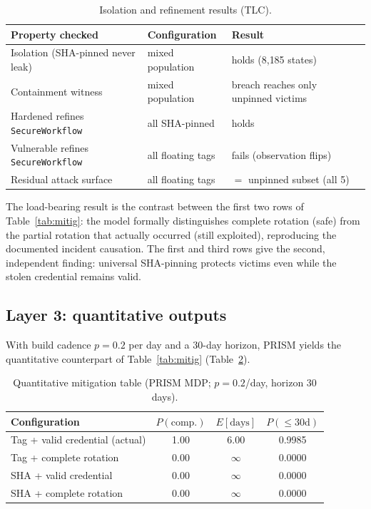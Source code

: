 \documentclass[letterpaper,twocolumn,10pt]{article}
\newcommand{\code}[1]{\texttt{\small #1}}
\begin{document}
\begin{table}[t]\centering
\caption{Isolation and refinement results (TLC).}\label{tab:iso}
\begin{tabular}{@{}lll@{}}
\toprule
Property checked & Configuration & Result\\
\midrule
Isolation (SHA-pinned never leak) & mixed population & holds (8{,}185 states)\\
Containment witness & mixed population & breach reaches only unpinned victims\\
Hardened refines \code{SecureWorkflow} & all SHA-pinned & holds\\
Vulnerable refines \code{SecureWorkflow} & all floating tags & fails (observation flips)\\
Residual attack surface & all floating tags & $=$ unpinned subset (all 5)\\
\bottomrule
\end{tabular}
\end{table}

The load-bearing result is the contrast between the first two rows of Table~\ref{tab:mitig}: the model formally distinguishes complete rotation (safe) from the partial rotation that actually occurred (still exploited), reproducing the documented incident causation. The first and third rows give the second, independent finding: universal SHA-pinning protects victims even while the stolen credential remains valid.

\subsection{Layer 3: quantitative outputs}
With build cadence $p = 0.2$ per day and a 30-day horizon, PRISM yields the quantitative counterpart of Table~\ref{tab:mitig} (Table~\ref{tab:quant}).

\begin{table}[t]\centering
\caption{Quantitative mitigation table (PRISM MDP; $p=0.2$/day, horizon 30 days).}\label{tab:quant}
\small
\begin{tabular}{@{}lccc@{}}
\toprule
Configuration & $P(\text{comp.})$ & $E[\text{days}]$ & $P(\leq 30\text{d})$\\
\midrule
Tag + valid credential (actual) & 1.00 & 6.00 & 0.9985\\
Tag + complete rotation & 0.00 & $\infty$ & 0.0000\\
SHA + valid credential & 0.00 & $\infty$ & 0.0000\\
SHA + complete rotation & 0.00 & $\infty$ & 0.0000\\
\bottomrule
\end{tabular}
\end{table}
\end{document}
